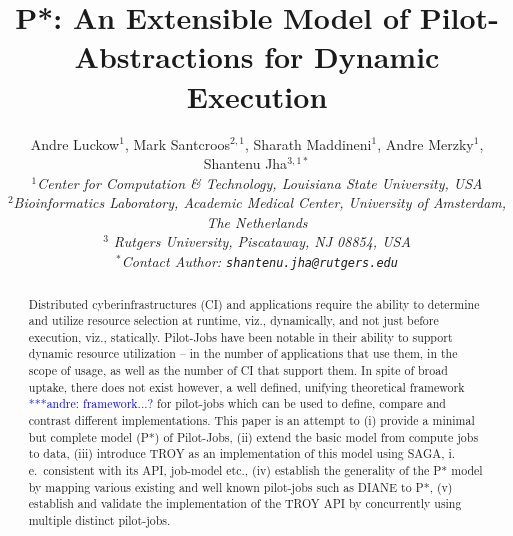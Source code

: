 \documentclass[conference,final]{IEEEtran}
\title{P*: An Extensible Model of Pilot-Abstractions for Dynamic Execution}
\date{}
\newcommand{\alnote}[1]{ {\textcolor{blue} { ***andre: #1 }}}
\newcommand{\alnote}[1]{}
\newcommand{\up}{\vspace*{-1em}}
\newcommand{\upp}{\vspace*{-0.5em}}
\begin{document}
\ifpdf
{}
\else
{}
\fi

\author{
  Andre Luckow$^{1}$, Mark Santcroos$^{2,1}$, Sharath Maddineni$^{1}$, Andre Merzky$^{1}$, Shantenu Jha$^{3,1*}$\\
  \small{\emph{$^{1}$Center for Computation \& Technology, Louisiana State University, USA}}\\
 \small{\emph{$^{2}$Bioinformatics Laboratory, Academic Medical Center, University of Amsterdam, The Netherlands}}\\
 \small{\emph{$^{3}$ Rutgers University, Piscataway, NJ 08854, USA}}\\
  \small{\emph{$^{*}$Contact Author: \texttt{shantenu.jha@rutgers.edu}}}\\
  \up\up\up\up }

\maketitle

\begin{abstract}
  Distributed cyberinfrastructures (CI) and applications require the
  ability to determine and utilize resource selection at runtime,
  viz., dynamically, and not just before execution, viz., statically.
  Pilot-Jobs have been notable in their ability to support dynamic
  resource utilization -- in the number of applications that use them,
  in the scope of usage, as well as the number of CI that support
  them.  In spite of broad uptake, there does not exist however, a
  well defined, unifying theoretical framework\alnote{framework...?} for 
  pilot-jobs which
  can be used to define, compare and contrast different
  implementations. This paper is an attempt to (i) provide a minimal
  but complete model (P*) of Pilot-Jobs, (ii) extend the basic model
  from compute jobs to data, (iii) introduce TROY as an implementation
  of this model using SAGA, i.\,e.\ consistent with its API, job-model
  etc., (iv) establish the generality of the P* model by mapping
  various existing and well known pilot-jobs such as DIANE to P*, (v)
  establish and validate the implementation of the TROY API by
  concurrently using multiple distinct pilot-jobs.\upp\upp\upp\upp
\end{abstract}
\end{document}
